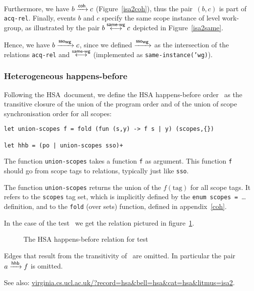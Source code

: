 \documentclass[a4paper]{article}
\begin{document}
Furthermore, we have $b \xrightarrow{\textsf{\scriptsize{}coh}} c$ (Figure~\ref{isa2coh}), thus the pair~$(b,c)$
is part of \texttt{acq-rel}.  Finally, events $b$ and $c$ specify the same
scope instance of level work-group, as illustrated by the pair $b \stackrel{\textsf{\scriptsize{}same-wg}}{\longleftrightarrow} c$
depicted in Figure~\ref{isa2same}.

Hence,  we have $b \xrightarrow{\textsf{\scriptsize{}sso$_{\textsf{\scriptsize{}wg}}$}} c$, since we defined $\xrightarrow{\textsf{\scriptsize{}sso$_{\textsf{\scriptsize{}wg}}$}}$ as the intersection
of the relations \texttt{acq-rel} and $\stackrel{\textsf{\scriptsize{}same-wg}}{\longleftrightarrow}$ (implemented as
\texttt{same-instance('wg)}).

\subsubsection{Heterogeneous happens-before \label{sec:hhb}}

Following the HSA~document, we define the HSA happens-before order~\hhb{} as
the transitive closure of the union of the program order and of the union of
scope synchronisation order for all scopes:
\begin{verbatim}
let union-scopes f = fold (fun (s,y) -> f s | y) (scopes,{})

let hhb = (po | union-scopes sso)+
\end{verbatim}

The function \texttt{union-scopes} takes a function {\tt f} as argument.  This
function {\tt f} should go from scope tags to relations, typically just like
\texttt{sso}.

The function \texttt{union-scopes} returns the union of the
\texttt{$f(\text{tag})$} for all scope tags.  It refers to the \texttt{scopes}
tag set, which is implicitly defined by the \verb+enum scopes = +\ldots{}
definition, and to the \verb+fold+ (over sets) function, defined in
appendix~\ref{coh}.

In the case of the test~ we get the \hhb{} relation pictured
in figure~\ref{isa2hhb}.
\begin{figure}
\begin{center}
\end{center}
\caption{\label{isa2hhb} The HSA happens-before relation for test~ \color{red}{(Forbidden)}}
\end{figure}
Edges that result from the transitivity of~\hhb{} are omitted. In particular
the pair $a \xrightarrow{\textsf{\scriptsize{}hhb}} f$ is omitted. 

See also: \url{virginia.cs.ucl.ac.uk/?record=hsa&bell=hsa&cat=hsa&litmus=isa2}.
\end{document}
